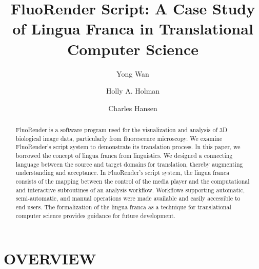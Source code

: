 \documentclass{IEEEcsmag}
\begin{document}
\title{FluoRender Script: A Case Study of Lingua Franca in Translational Computer Science}

\author{Yong Wan}

\author{Holly A. Holman}

\author{Charles Hansen}


\begin{abstract}
  FluoRender is a software program used for the visualization and analysis of 3D biological image data, particularly from fluorescence microscopy. We examine FluoRender’s script system to demonstrate its translation process. In this paper, we borrowed the concept of lingua franca from linguistics. We designed a connecting language between the source and target domains for translation, thereby augmenting understanding and acceptance. In FluoRender’s script system, the lingua franca consists of the mapping between the control of the media player and the computational and interactive subroutines of an analysis workflow. Workflows supporting automatic, semi-automatic, and manual operations were made available and easily accessible to end users. The formalization of the lingua franca as a technique for translational computer science provides guidance for future development.
\end{abstract}

\maketitle

\section{OVERVIEW}
\end{document}

